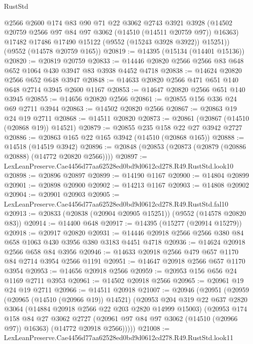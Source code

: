 \begin{lexlean}{RustStd}
\begin{coremodule}
        @2566
        @2600
        @174
        @83
        @90
        @71
        @22
        @3062
        @2743
        @3921
        @3928
        (@14502 @20759 @2566 @97 @84 @97 @3062 (@14510 (@14511 @20759 @97)) @16363)
        @17482
        @17486
        @17490
        @15122
        (@9552 (@15243 @3928 @3922))
        @15251))
    (@9552 (@14578 @20759 @165))
@20819 := @14395 (@15134 (@14401 @15136))
@20820 := @20819 @20759
@20833 := @14446 @20820 @2566 @2566 @83 @648 @652 @1064 @430 @3947 @83 @3938 @4452 @4718
@20838 := @14624 @20820 @2566 @652 @648 @3947
@20848 := @14633 @20820 @2566 @471 @651 @140 @648 @2714 @3945 @2600 @1167
@20853 := @14647 @20820 @2566 @651 @140 @3945
@20855 := @14656 @20820 @2566
@20861 := @20855 @156 @336 @24 @69 @2711 @3944
@20863 := @14502 @20820 @2566
@20867 := @20863 @19 @24 @19 @2711
@20868 := @14511 @20820
@20873 := @20861 (@20867 (@14510 (@20868 @19)) @14521)
@20879 := @20855 @235 @158 @22 @27 @3942 @2727
@20886 := @20863 @165 @22 @165 @3942 (@14510 (@20868 @165))
@20888 := @14518 (@14519 @3942)
@20896 := @20848 (@20853 (@20873 (@20879 (@20886 @20888) (@14772 @20820 @2566))))
@20897 := LexLeanPreserve.Cae4456d77aa62528ed0bd9d0612cd278.R49.RustStd.look10
@20898 := @20896 @20897
@20899 := @14190 @1167
@20900 := @14804 @20899
@20901 := @20898 @20900
@20902 := @14213 @1167
@20903 := @14808 @20902
@20904 := @20901 @20903
@20905 := LexLeanPreserve.Cae4456d77aa62528ed0bd9d0612cd278.R49.RustStd.fal10
@20913 := @20833 (@20838 (@20904 @20905 @15251)) (@9552 (@14578 @20820 @83))
@20914 := @14400 @648
@20917 := @14395 (@15277 (@20914 @15279))
@20918 := @20917 @20820
@20931 := @14446 @20918 @2566 @2566 @380 @84 @658 @1063 @430 @3956 @380 @3183 @4451 @4718
@20936 := @14624 @20918 @2566 @658 @84 @3956
@20946 := @14633 @20918 @2566 @479 @657 @1170 @84 @2714 @3954 @2566 @1191
@20951 := @14647 @20918 @2566 @657 @1170 @3954
@20953 := @14656 @20918 @2566
@20959 := @20953 @156 @656 @24 @1169 @2711 @3953
@20961 := @14502 @20918 @2566
@20965 := @20961 @19 @24 @19 @2711
@20966 := @14511 @20918
@21007 := @20946
    (@20951
      (@20959
        (@20965 (@14510 (@20966 @19)) @14521)
        (@20953
          @204
          @319
          @22
          @637
          @2820
          @3064
          (@14884 @20918 @2566 @22 @203 @2820 @14999 @15003)
          (@20953
            @174
            @158
            @84
            @27
            @3062
            @2727
            (@20961 @97 @84 @97 @3062 (@14510 (@20966 @97)) @16363)
            (@14772 @20918 @2566)))))
@21008 := LexLeanPreserve.Cae4456d77aa62528ed0bd9d0612cd278.R49.RustStd.look11

\end{coremodule}
\end{lexlean}
